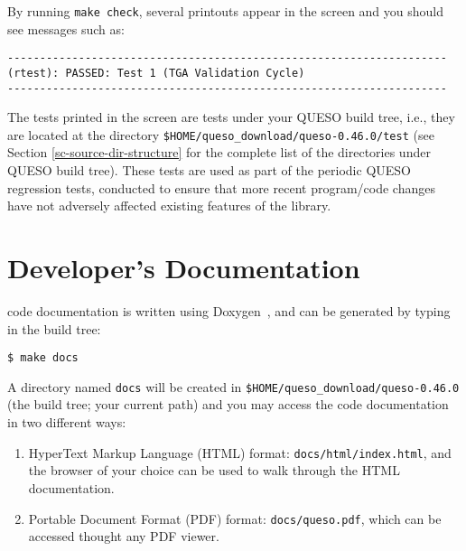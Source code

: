 By running \texttt{make check}, several printouts appear in the screen and you should see messages such as:
\begin{lstlisting}
--------------------------------------------------------------------
(rtest): PASSED: Test 1 (TGA Validation Cycle)
--------------------------------------------------------------------
\end{lstlisting}

The tests printed in  the screen are tests under your QUESO build tree, i.e., they are located at the  directory \verb+$HOME/queso_download/queso-0.46.0/test+ (see Section \ref{sc-source-dir-structure} for the complete list of the directories under QUESO build tree).    
These tests are used as part of the periodic QUESO regression tests, conducted to ensure that more recent program/code changes have not adversely affected existing features of the library.



\section{\Queso{} Developer's Documentation}\label{sec:Queso_docs}



\Queso{} code documentation is written using Doxygen~\cite{Doxygen}, and can be generated by typing in the build tree:
\begin{lstlisting}
$ make docs
\end{lstlisting}

A directory named \verb+docs+ will be created in \verb+$HOME/queso_download/queso-0.46.0+ (the build tree; your current path) and you may access the code documentation in two different ways:
\begin{enumerate}
 \item HyperText Markup Language (HTML)  format: \verb+docs/html/index.html+, and the browser of your choice can be used to walk through the HTML documentation.

\item Portable Document Format (PDF) format: \verb+docs/queso.pdf+, which can be accessed thought any PDF viewer.
\end{enumerate}
% 

